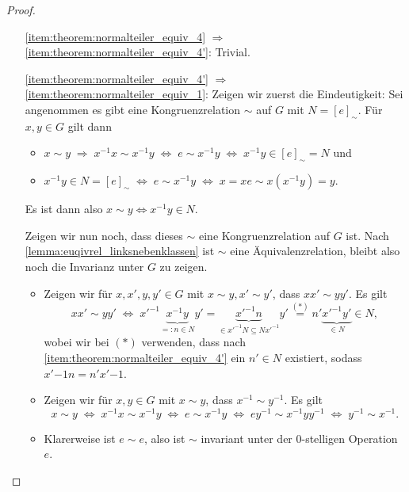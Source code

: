 \begin{proof}{\ }
\begin{itemize}[topsep=0cm, leftmargin=2.2cm]
        \item[\ref*{item:theorem:normalteiler_equiv_4} $\Rightarrow$ \ref*{item:theorem:normalteiler_equiv_4'}:] 
        Trivial.
        
        \item[\ref*{item:theorem:normalteiler_equiv_4'} $\Rightarrow$ \ref*{item:theorem:normalteiler_equiv_1}:]  
        Zeigen wir zuerst die Eindeutigkeit: Sei angenommen es gibt eine Kongruenzrelation $\sim$ auf $G$ mit $N = [e]_\sim$. Für $x, y\in G$ gilt dann 
        \begin{itemize}[label={--}]
            \item $x \sim y \;\Rightarrow\; x^{-1}x \sim x^{-1}y \; \Leftrightarrow\; e \sim x^{-1}y \;\Leftrightarrow\; x^{-1}y \in [e]_\sim = N$ und
            \item $x^{-1}y \in N = [e]_\sim \;\Leftrightarrow\; e \sim x^{-1}y \;\Leftrightarrow\; x = xe \sim x(x^{-1}y) = y$.
        \end{itemize}
        Es ist dann also $x \sim y \Leftrightarrow x^{-1}y \in N$. 
        
        Zeigen wir nun noch, dass dieses $\sim$ eine Kongruenzrelation auf $G$ ist. Nach \cref{lemma:euqivrel_linksnebenklassen} ist $\sim$ eine Äquivalenzrelation, bleibt also noch die Invarianz unter $G$ zu zeigen. 
        \begin{itemize}[label={--}]
            \item Zeigen wir für $x,x',y,y' \in G$ mit $x \sim y, x' \sim y'$, dass $xx'\sim yy'$. Es gilt 
            $$ xx'\sim yy' \;\Leftrightarrow\; x'^{-1}\underbrace{x^{-1}y}_{=: n \in N} y' = \underbrace{x'^{-1} n}_{\in x'^{-1}N \subseteq Nx'^{-1}} y' \overset{(*)}{=} n'\underbrace{x'^{-1}y'}_{\in N} \in N, $$
            wobei wir bei $(*)$ verwenden, dass nach \ref*{item:theorem:normalteiler_equiv_4'} ein $n' \in N$ existiert, sodass $x'{-1} n = n' x'{-1}$.
            \item Zeigen wir für $x,y \in G$ mit $x \sim y$, dass $x^{-1} \sim y^{-1}$. Es gilt
            $$ x\sim y \;\Leftrightarrow\; x^{-1}x \sim x^{-1}y \;\Leftrightarrow\; e \sim x^{-1}y \;\Leftrightarrow\; ey^{-1} \sim x^{-1} y y^{-1} \;\Leftrightarrow\; y^{-1} \sim x^{-1}.$$ 
            \item Klarerweise ist $e \sim e$, also ist $\sim$ invariant unter der 0-stelligen Operation $e$.
        \end{itemize}
    \end{itemize}
\end{proof}

